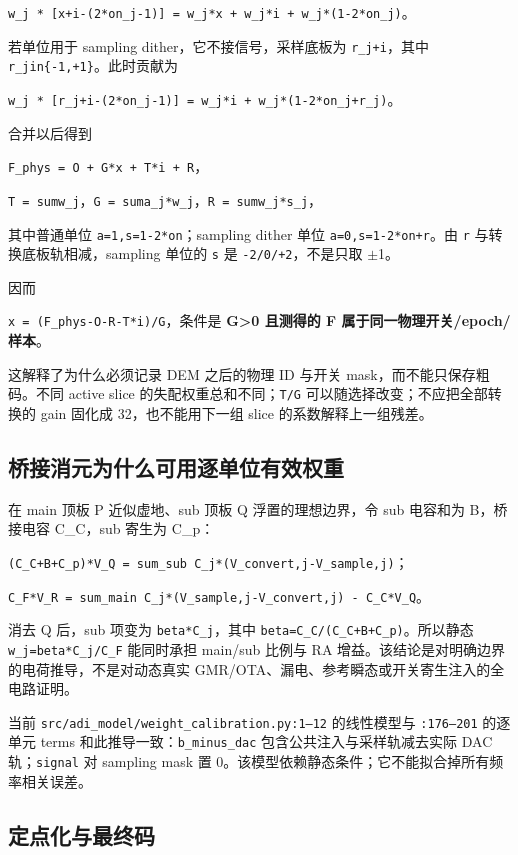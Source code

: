 \documentclass[UTF8,fontset=fandol,10pt,a4paper,openany]{ctexrep}
\newcommand{\code}[1]{\nolinkurl{#1}}
\begin{document}
\code{w_j * [x+i-(2*on_j-1)] = w_j*x + w_j*i + w_j*(1-2*on_j)}。


若单位用于 sampling dither，它不接信号，采样底板为 \code{r_j+i}，其中 \texttt{r\_jin\{-1,+1\}}。此时贡献为


\code{w_j * [r_j+i-(2*on_j-1)] = w_j*i + w_j*(1-2*on_j+r_j)}。


合并以后得到


\code{F_phys = O + G*x + T*i + R}，


\code{T = sumw_j}，\code{G = suma_j*w_j}，\code{R = sumw_j*s_j}，


其中普通单位 \code{a=1,s=1-2*on}；sampling dither 单位 \code{a=0,s=1-2*on+r}。由 \code{r} 与转换底板轨相减，sampling 单位的 \code{s} 是 \code{-2/0/+2}，不是只取 \ensuremath{\pm}1。


因而


\code{x = (F_phys-O-R-T*i)/G}，条件是 \textbf{G>0 且测得的 F 属于同一物理开关/epoch/样本}。


这解释了为什么必须记录 DEM 之后的物理 ID 与开关 mask，而不能只保存粗码。不同 active slice 的失配权重总和不同；\code{T/G} 可以随选择改变；不应把全部转换的 gain 固化成 32，也不能用下一组 slice 的系数解释上一组残差。


\subsection{桥接消元为什么可用逐单位有效权重}


在 main 顶板 P 近似虚地、sub 顶板 Q 浮置的理想边界，令 sub 电容和为 B，桥接电容 C\_C，sub 寄生为 C\_p：


\code{(C_C+B+C_p)*V_Q = sum_sub C_j*(V_convert,j-V_sample,j)}；


\code{C_F*V_R = sum_main C_j*(V_sample,j-V_convert,j) - C_C*V_Q}。


消去 Q 后，sub 项变为 \code{beta*C_j}，其中 \code{beta=C_C/(C_C+B+C_p)}。所以静态 \code{w_j=beta*C_j/C_F} 能同时承担 main/sub 比例与 RA 增益。该结论是对明确边界的电荷推导，不是对动态真实 GMR/OTA、漏电、参考瞬态或开关寄生注入的全电路证明。


当前 \code{src/adi_model/weight_calibration.py:1–12} 的线性模型与 \code{:176–201} 的逐单元 terms 和此推导一致：\code{b_minus_dac} 包含公共注入与采样轨减去实际 DAC 轨；\code{signal} 对 sampling mask 置 0。该模型依赖静态条件；它不能拟合掉所有频率相关误差。


\subsection{定点化与最终码}
\end{document}
